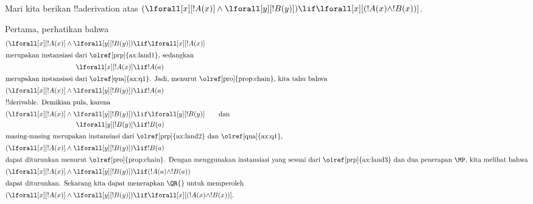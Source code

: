 \documentclass[../../../include/open-logic-section]{subfiles}
\begin{document}


\begin{ex}
Mari kita berikan !!a{derivation} atas $(\lforall[x][!A(x)] \land
\lforall[y][!B(y)]) \lif \lforall[x][(!A(x) \land !B(x))]$.

Pertama, perhatikan bahwa
\begin{align*}
  (\lforall[x][!A(x)] \land \lforall[y][!B(y)]) & \lif \lforall[x][!A(x)]\\
  \intertext{merupakan instansiasi dari \olref[prp]{ax:land1}, sedangkan}
  \lforall[x][!A(x)] & \lif !A(a) \\
  \intertext{merupakan instansiasi dari \olref[qua]{ax:q1}. Jadi, menurut \olref[pro]{prop:chain}, kita tahu bahwa}
  (\lforall[x][!A(x)] \land \lforall[y][!B(y)]) & \lif !A(a) \\
  \intertext{!!{derivable}. Demikian pula, karena}
  (\lforall[x][!A(x)] \land \lforall[y][!B(y)]) & \lif \lforall[y][!B(y)] \qquad\text{dan}\\
    \lforall[y][!B(y)] & \lif !B(a)\\
    \intertext{masing-masing merupakan instansiasi dari \olref[prp]{ax:land2} dan \olref[qua]{ax:q1},}
    (\lforall[x][!A(x)] \land \lforall[y][!B(y)]) & \lif !B(a)\\
    \intertext{dapat diturunkan menurut \olref[pro]{prop:chain}. Dengan menggunakan instansiasi yang sesuai dari \olref[prp]{ax:land3} dan dua penerapan~\MP, kita melihat bahwa}
    (\lforall[x][!A(x)] \land \lforall[y][!B(y)]) & \lif (!A(a) \land !B(a))\\
    \intertext{dapat diturunkan. Sekarang kita dapat menerapkan \QR{} untuk memperoleh}
(\lforall[x][!A(x)] \land \lforall[y][!B(y)]) & \lif \lforall[x][(!A(x) \land !B(x))].
\end{align*}
\end{ex}
\end{document}
